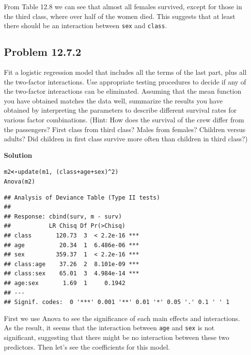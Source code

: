 \documentclass[12pt,oneside,a4paper]{article}\usepackage[]{graphicx}\usepackage[]{xcolor}
\makeatletter
\newcommand{\hlnum}[1]{\textcolor[rgb]{0,0,0}{#1}}%
\newcommand{\hlopt}[1]{\textcolor[rgb]{0,0,0}{#1}}%
\newcommand{\hlstd}[1]{\textcolor[rgb]{0,0,0}{#1}}%
\newcommand{\hlkwb}[1]{\textcolor[rgb]{0.498,0,0.333}{\textbf{#1}}}%
\newcommand{\hlkwd}[1]{\textcolor[rgb]{0,0,0}{#1}}%
\newenvironment{kframe}{%
 \def\at@end@of@kframe{}%
 \ifinner\ifhmode%
  \def\at@end@of@kframe{\end{minipage}}%
  \begin{minipage}{\columnwidth}%
 \fi\fi%
 \def\FrameCommand##1{\hskip\@totalleftmargin \hskip-\fboxsep
 \colorbox{shadecolor}{##1}\hskip-\fboxsep
     \hskip-\linewidth \hskip-\@totalleftmargin \hskip\columnwidth}%
 \MakeFramed {\advance\hsize-\width
   \@totalleftmargin\z@ \linewidth\hsize
   \@setminipage}}%
 {\par\unskip\endMakeFramed%
 \at@end@of@kframe}
\newenvironment{knitrout}{}{} %
\newcommand{\subproblem}[1]
{
    \subsection*{Problem {#1}}
}
\newcommand{\solution}
{
    \vspace{15pt}
    \noindent\ignorespaces\textbf{\large Solution}\par
}
\newcommand{\m}[1]{\texttt{{#1}}}
\makeatother
\begin{document}
From Table 12.8 we can see that almost all females survived, except for those in the third class, where over half of the women died. This suggests that at least there should be an interaction between \m{sex} and \m{class}.

\subproblem{12.7.2}
Fit a logistic regression model that includes all the terms of the last part, plus all the two-factor interactions. Use appropriate testing procedures to decide if any of the two-factor interactions can be eliminated. Assuming that the mean function you have obtained matches the data well, summarize the results you have obtained by interpreting the parameters to describe different survival rates for various factor combinations. (Hint: How does the survival of the crew differ from the passengers? First class from third class? Males from females? Children versus adults? Did children in first class survive more often than children in third class?)

\solution
\begin{knitrout}
\color{fgcolor}\begin{kframe}
\begin{alltt}
\hlstd{m2} \hlkwb{<-} \hlkwd{update}\hlstd{(m1,} \hlopt{~} \hlstd{(class} \hlopt{+} \hlstd{age} \hlopt{+} \hlstd{sex)} \hlopt{^} \hlnum{2}\hlstd{)}
\hlkwd{Anova}\hlstd{(m2)}
\end{alltt}
\begin{verbatim}
## Analysis of Deviance Table (Type II tests)
## 
## Response: cbind(surv, m - surv)
##           LR Chisq Df Pr(>Chisq)    
## class       120.73  3  < 2.2e-16 ***
## age          20.34  1  6.486e-06 ***
## sex         359.37  1  < 2.2e-16 ***
## class:age    37.26  2  8.101e-09 ***
## class:sex    65.01  3  4.984e-14 ***
## age:sex       1.69  1     0.1942    
## ---
## Signif. codes:  0 '***' 0.001 '**' 0.01 '*' 0.05 '.' 0.1 ' ' 1
\end{verbatim}
\end{kframe}
\end{knitrout}

First we use Anova to see the significance of each main effects and interactions. As the result, it seems that the interaction between \m{age} and \m{sex} is not significant, suggesting that there might be no interaction between these two predictors. Then let's see the coefficients for this model.
\end{document}
